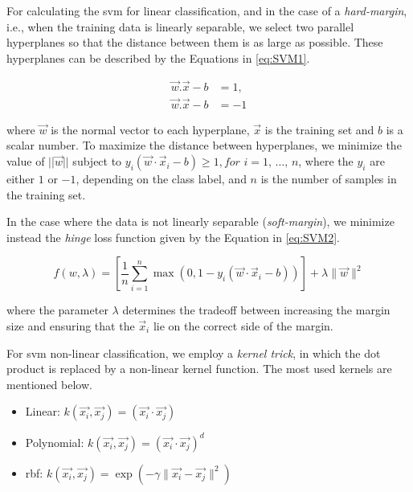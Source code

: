 For calculating the \ac{svm} for linear classification, and in the case of a \textit{hard-margin}, i.e., when the training data is linearly separable, we select two parallel hyperplanes so that the distance between them is as large as possible.
These hyperplanes can be described by the Equations in \ref{eq:SVM1}.

\begin{equation}
\label{eq:SVM1}
\begin{split}
\vec{w}.\vec{x}-b&=1, \\
\vec{w}.\vec{x}-b&=-1
\end{split}
\end{equation}

where $\vec{w}$ is the normal vector to each hyperplane, $\vec{x}$ is the training set and $b$ is a scalar number.
To maximize the distance between hyperplanes, we minimize the value of $||\vec{w}||$ subject to ${\displaystyle y_{i}({\vec {w}}\cdot {\vec {x}}_{i}-b)\geq 1,} for$ ${\displaystyle i=1,\,\ldots ,\,n} $, where the $y_{i}$ are either $1$ or $-1$, depending on the class label, and $n$ is the number of samples in the training set.

In the case where the data is not linearly separable (\textit{soft-margin}), we minimize instead the \textit{hinge} loss function given by the Equation in \ref{eq:SVM2}.

\begin{equation}
\label{eq:SVM2}
f(w,\lambda)={\displaystyle \left[{\frac {1}{n}}\sum _{i=1}^{n}\max \left(0,1-y_{i}({\vec {w}}\cdot {\vec {x}}_{i}-b)\right)\right]+\lambda \lVert {\vec {w}}\rVert ^{2}}
\end{equation}

where the parameter $\lambda$ determines the tradeoff between increasing the margin size and ensuring that the ${\vec {x}}_{i}$ lie on the correct side of the margin.

For \ac{svm} non-linear classification, we employ a \textit{kernel trick}, in which the dot product is replaced by a non-linear kernel function. The most used kernels are mentioned below.

\begin{itemize}
    
    \item Linear: ${\displaystyle k({\vec {x_{i}}},{\vec {x_{j}}})=({\vec {x_{i}}}\cdot {\vec {x_{j}}})}$

    \item Polynomial: ${\displaystyle k({\vec {x_{i}}},{\vec {x_{j}}})=({\vec {x_{i}}}\cdot {\vec {x_{j}}})^{d}}$

    \item \ac{rbf}: ${\displaystyle k({\vec {x_{i}}},{\vec {x_{j}}})=\exp(-\gamma \|{\vec {x_{i}}}-{\vec {x_{j}}}\|^{2})}$
\end{itemize}


